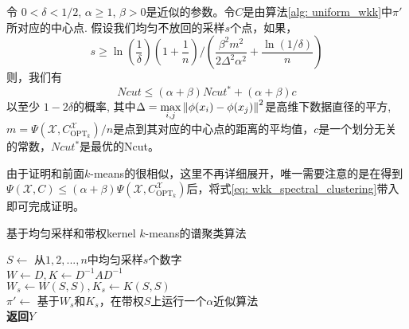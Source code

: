 \begin{theorem}[均匀不放回采样的谱聚类解的质量2]
    \label{theo: uniform_wkk_sharper}
    令 $0 < \delta <1/2$, $\alpha \geq 1$, $\beta >0$是近似的参数。令$C$是由算法\ref{alg: uniform_wkk}中$\pi'$所对应的中心点. 假设我们均匀不放回的采样$s$个点，如果，
    \begin{equation*}
    s \geq \ln(\frac{1}{\delta})(1+\frac{1}{n})/(\frac{\beta^2 m^2}{2\Delta^2 \alpha^2}+\frac{\ln(1/\delta)}{n})
    \end{equation*}
    则，我们有
    \begin{equation*}
    Ncut \leq (\alpha + \beta) Ncut^* + (\alpha + \beta)c
    \end{equation*}
    以至少 $1-2\delta$的概率, 其中$\Delta = \max\limits_{i,j}\left\lVert\phi(x_i) - \phi(x_j)\right\rVert^2$是高维下数据直径的平方, $m = \Psi(\mathcal{X},C_{\text{OPT}_k}^{\mathcal{X}})/n$是点到其对应的中心点的距离的平均值，$c$是一个划分无关的常数，$Ncut^*$是最优的Ncut。
\end{theorem}
由于证明和前面$k$-means的很相似，这里不再详细展开，唯一需要注意的是在得到$\Psi(\mathcal{X},C) \leq (\alpha+\beta) \Psi(\mathcal{X},C_{\text{OPT}_k}^{\mathcal{X}})$后，将式\ref{eq: wkk_spectral_clustering}带入即可完成证明。
\begin{algorithm}
	\SetNoFillComment
    \caption{基于均匀采样和带权kernel $k$-means的谱聚类算法}\label{alg: uniform_wkk}
    $S \gets$ 从$1,2,...,n$中均匀采样$s$个数字\\
    $W \gets D,K \gets D^{-1}AD^{-1}$\\
    $W_s \gets W(S,S), K_s \gets K(S,S)$\\
    $\pi' \gets$ 基于$W_s$和$K_s$，在带权$S$上运行一个$\alpha$近似算法\\
    \textbf{返回}$Y$
\end{algorithm}